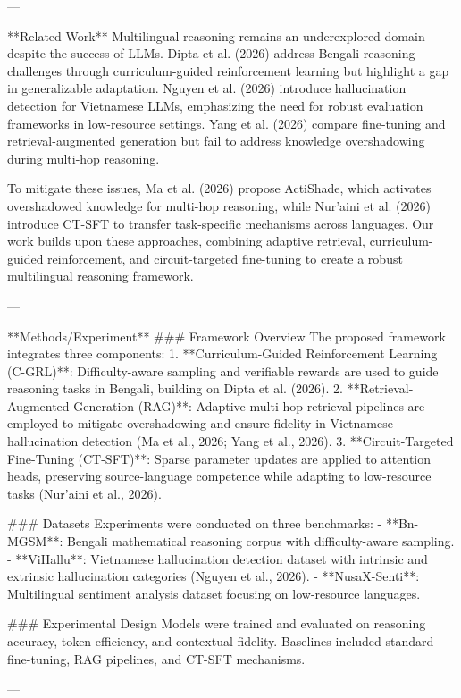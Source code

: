 ---

**Related Work**  
Multilingual reasoning remains an underexplored domain despite the success of LLMs. Dipta et al. (2026) address Bengali reasoning challenges through curriculum-guided reinforcement learning but highlight a gap in generalizable adaptation. Nguyen et al. (2026) introduce hallucination detection for Vietnamese LLMs, emphasizing the need for robust evaluation frameworks in low-resource settings. Yang et al. (2026) compare fine-tuning and retrieval-augmented generation but fail to address knowledge overshadowing during multi-hop reasoning.

To mitigate these issues, Ma et al. (2026) propose ActiShade, which activates overshadowed knowledge for multi-hop reasoning, while Nur’aini et al. (2026) introduce CT-SFT to transfer task-specific mechanisms across languages. Our work builds upon these approaches, combining adaptive retrieval, curriculum-guided reinforcement, and circuit-targeted fine-tuning to create a robust multilingual reasoning framework.

---

**Methods/Experiment**  
### Framework Overview  
The proposed framework integrates three components:
1. **Curriculum-Guided Reinforcement Learning (C-GRL)**: Difficulty-aware sampling and verifiable rewards are used to guide reasoning tasks in Bengali, building on Dipta et al. (2026).
2. **Retrieval-Augmented Generation (RAG)**: Adaptive multi-hop retrieval pipelines are employed to mitigate overshadowing and ensure fidelity in Vietnamese hallucination detection (Ma et al., 2026; Yang et al., 2026).
3. **Circuit-Targeted Fine-Tuning (CT-SFT)**: Sparse parameter updates are applied to attention heads, preserving source-language competence while adapting to low-resource tasks (Nur’aini et al., 2026).

### Datasets  
Experiments were conducted on three benchmarks:
- **Bn-MGSM**: Bengali mathematical reasoning corpus with difficulty-aware sampling.
- **ViHallu**: Vietnamese hallucination detection dataset with intrinsic and extrinsic hallucination categories (Nguyen et al., 2026).
- **NusaX-Senti**: Multilingual sentiment analysis dataset focusing on low-resource languages.

### Experimental Design  
Models were trained and evaluated on reasoning accuracy, token efficiency, and contextual fidelity. Baselines included standard fine-tuning, RAG pipelines, and CT-SFT mechanisms.

---

